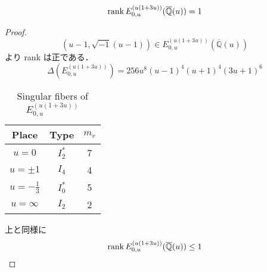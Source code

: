 \documentclass[main]{subfiles}
\begin{document}
\begin{thm}
    \begin{equation}
        \operatorname{rank} E_{0,u}^{(u(1 + 3u))}(\overline{\mathbb{Q}}(u)) = 1
    \end{equation}
\end{thm}
\begin{proof}
    \begin{equation}
        (u - 1, \sqrt{-1}(u - 1)) \in E_{0,u}^{(u(1 + 3u))}(\overline{\mathbb{Q}}(u))
    \end{equation}
    より rank は正である．
    \begin{equation}
        \Delta(E_{0,u}^{(u(1 + 3u))}) = 256u^{8}(u - 1)^{4}(u + 1)^{4}(3u + 1)^{6}
    \end{equation}
    \begin{table}[h]
        \centering
        \caption{Singular fibers of $E_{0,u}^{(u(1 + 3u))}$}
        \begin{tabular}{|c|c|c|}
            \hline
            Place            & Type    & $m_v$ \\
            \hline
            $u=0$            & $I_2^*$ & 7     \\
            $u=\pm 1$        & $I_4$   & 4     \\
            $u=-\frac{1}{3}$ & $I_0^*$ & 5     \\
            $u=\infty$       & $I_2$   & 2     \\
            \hline
        \end{tabular}
    \end{table}
    上と同様に
    \begin{equation}
        \operatorname{rank} E_{0,u}^{(u(1 + 3u))}(\overline{\mathbb{Q}}(u)) \leq 1
    \end{equation}
\end{proof}
\end{document}
